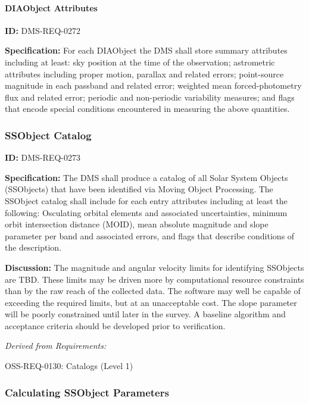 \documentclass[SE,toc,lsstdraft]{lsstdoc}
\begin{document}
\paragraph{DIAObject Attributes}\hfill  %

\label{DMS-REQ-0272}
\textbf{ID:} DMS-REQ-0272

\textbf{Specification:} For each DIAObject the DMS shall store summary attributes including at least: sky position at the time of the observation; astrometric attributes including proper motion, parallax and related errors; point-source magnitude in each passband and related error; weighted mean forced-photometry flux and related error; periodic and non-periodic variability measures; and flags that encode special conditions encountered in measuring the above quantities.






\subsubsection{SSObject Catalog}

\label{DMS-REQ-0273}
\textbf{ID:} DMS-REQ-0273

\textbf{Specification:} The DMS shall produce a catalog of all Solar System Objects (SSObjects) that have been identified via Moving Object Processing. The SSObject catalog shall include for each entry attributes including at least the following: Osculating orbital elements and associated uncertainties, minimum orbit intersection distance (MOID), mean absolute magnitude and slope parameter per band and associated errors, and flags that describe conditions of the description.

\textbf{Discussion: }The magnitude and angular velocity limits for identifying SSObjects are TBD. These limits may be driven more by computational resource constraints than by the raw reach of the collected data. The software may well be capable of exceeding the required limits, but at an unacceptable cost. The slope parameter will be poorly constrained until later in the survey. A baseline algorithm and acceptance criteria should be developed prior to verification.




\emph{Derived from Requirements:}

OSS-REQ-0130:
Catalogs (Level 1) \newline


\subsubsection{Calculating SSObject Parameters}
\end{document}
